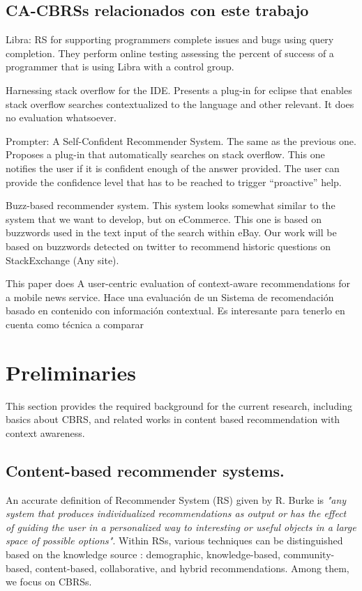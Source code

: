 \documentclass[preprint]{elsarticle}
\begin{document}
\begin{spacing}{2}
\subsection{CA-CBRSs relacionados con este trabajo}

\cite{Ponzanelli2014} Libra: RS for supporting programmers complete issues and bugs using query completion. They perform online testing assessing the percent of success of a programmer that is using Libra with a control group.

\cite{Ponzanelli2017} Harnessing stack overflow for the IDE. Presents a plug-in for eclipse that enables stack overflow searches contextualized to the language and other relevant. It does no evaluation whatsoever.

\cite{Ponzanelli2014b} Prompter: A Self-Confident Recommender System. The same as the previous one. Proposes a plug-in that automatically searches on stack overflow. This one notifies the user if it is confident enough of the answer provided. The user can provide the confidence level that has to be reached to trigger “proactive” help.

\cite{Parikh2009} Buzz-based recommender system. This system looks somewhat similar to the system that we want to develop, but on eCommerce. This one is based on buzzwords used in the text input of the search within eBay. Our work will be based on buzzwords detected on twitter to recommend historic questions on StackExchange (Any site).

\cite{DePessemier2016} This paper does A user-centric evaluation of context-aware recommendations for a mobile news service. Hace una evaluación de un Sistema de recomendación basado en contenido con información contextual. Es interesante para tenerlo en cuenta como técnica a comparar



\section{Preliminaries}

This section provides the required background for the current research, including basics about CBRS, and related works in content based recommendation with context awareness.

\subsection{Content-based recommender systems.}

An accurate definition of Recommender System (RS) given by R. Burke \cite{Burke2002} is \emph{"any system that produces individualized recommendations as output or has the effect of guiding the user in a personalized way to interesting or useful objects in a large space of possible options"}. Within RSs, various techniques can be distinguished based on the knowledge source \cite{DePessemier2016}: demographic, knowledge-based, community-based, content-based, collaborative, and hybrid recommendations. Among them, we focus on CBRSs.


\end{spacing}
\end{document}
